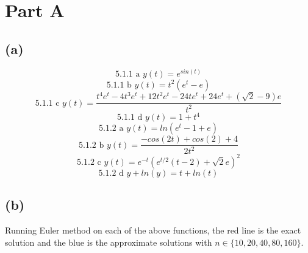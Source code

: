 \documentclass{article}
\begin{document}
\section*{Part A}
\subsection*{(a)}
$$ \text{5.1.1 a  } y(t) = e^{sin(t)} $$
$$ \text{5.1.1 b  } y(t) = t^2 (e^t - e)$$
$$ \text{5.1.1 c  } y(t) = \frac{t^4 e^t - 4t^3e^t + 12t^2e^t − 24te^t + 24e^t + (\sqrt{2} - 9)e}{t^2}$$
$$ \text{5.1.1 d  } y(t) = 1 + t^4$$
$$ \text{5.1.2 a  } y(t) = ln(e^t - 1 + e) $$
$$ \text{5.1.2 b  } y(t) = \frac{-cos(2t)+cos(2) + 4}{2t^2}$$
$$ \text{5.1.2 c  } y(t) = e^{-t}(e^{t/2}(t-2)  + \sqrt{2} e)^2$$
$$ \text{5.1.2 d  } y + ln(y) = t + ln(t)$$

\subsection*{(b)}
Running Euler method on each of the above functions, the red line is the exact solution and the blue is the approximate solutions with $ n \in \{ 10, 20, 40, 80, 160 \}$. 
\end{document}
